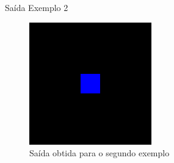 \documentclass[2pt]{beamer} %
\begin{document}
\begin{frame}{Saída Exemplo 2}
    
    
    \begin{figure}
        \centering
        \includegraphics[width=0.5\linewidth]{imgs/cube.png}
        \caption{Saída obtida para o segundo exemplo}
        \label{fig:enter-label}
    \end{figure}
    
\end{frame}




\end{document}
